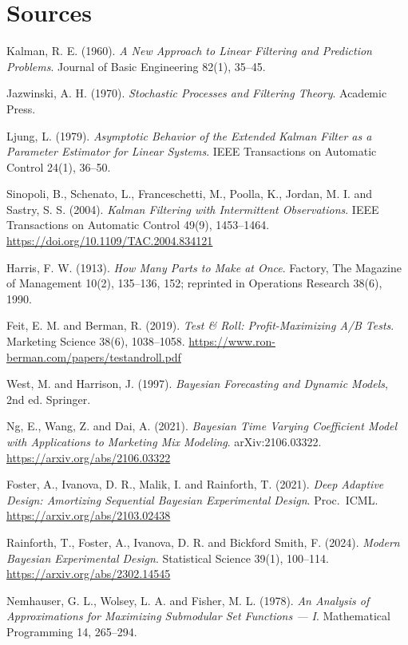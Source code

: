 \section*{Sources}
\begingroup\raggedright
\begin{enumerate}[label={[\arabic*]},leftmargin=2.5em]
\item Kalman, R. E. (1960). \emph{A New Approach to Linear Filtering and Prediction Problems}. Journal of Basic Engineering 82(1), 35--45.
\item Jazwinski, A. H. (1970). \emph{Stochastic Processes and Filtering Theory}. Academic Press.
\item Ljung, L. (1979). \emph{Asymptotic Behavior of the Extended Kalman Filter as a Parameter Estimator for Linear Systems}. IEEE Transactions on Automatic Control 24(1), 36--50.
\item Sinopoli, B., Schenato, L., Franceschetti, M., Poolla, K., Jordan, M. I. and Sastry, S. S. (2004). \emph{Kalman Filtering with Intermittent Observations}. IEEE Transactions on Automatic Control 49(9), 1453--1464. \url{https://doi.org/10.1109/TAC.2004.834121}
\item Harris, F. W. (1913). \emph{How Many Parts to Make at Once}. Factory, The Magazine of Management 10(2), 135--136, 152; reprinted in Operations Research 38(6), 1990.
\item Feit, E. M. and Berman, R. (2019). \emph{Test \& Roll: Profit-Maximizing A/B Tests}. Marketing Science 38(6), 1038--1058. \url{https://www.ron-berman.com/papers/testandroll.pdf}
\item West, M. and Harrison, J. (1997). \emph{Bayesian Forecasting and Dynamic Models}, 2nd ed. Springer.
\item Ng, E., Wang, Z. and Dai, A. (2021). \emph{Bayesian Time Varying Coefficient Model with Applications to Marketing Mix Modeling}. arXiv:2106.03322. \url{https://arxiv.org/abs/2106.03322}
\item Foster, A., Ivanova, D. R., Malik, I. and Rainforth, T. (2021). \emph{Deep Adaptive Design: Amortizing Sequential Bayesian Experimental Design}. Proc.\ ICML. \url{https://arxiv.org/abs/2103.02438}
\item Rainforth, T., Foster, A., Ivanova, D. R. and Bickford Smith, F. (2024). \emph{Modern Bayesian Experimental Design}. Statistical Science 39(1), 100--114. \url{https://arxiv.org/abs/2302.14545}
\item Nemhauser, G. L., Wolsey, L. A. and Fisher, M. L. (1978). \emph{An Analysis of Approximations for Maximizing Submodular Set Functions --- I}. Mathematical Programming 14, 265--294.

\end{enumerate}
